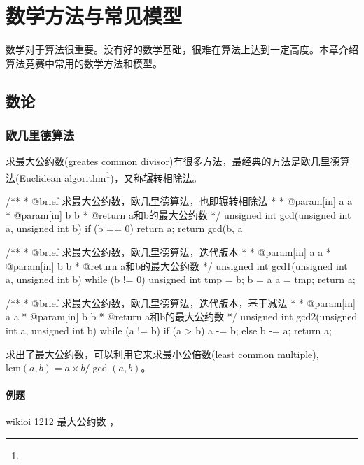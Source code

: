 \chapter{数学方法与常见模型}
数学对于算法很重要。没有好的数学基础，很难在算法上达到一定高度。本章介绍算法竞赛中常用的数学方法和模型。

\section{数论} %

\subsection{欧几里德算法}

求最大公约数(greates common divisor)有很多方法，最经典的方法是欧几里德算法(Euclidean algorithm\footnote{})，又称辗转相除法。

\begin{Codex}[label=gcd.c]
/**
 * @brief 求最大公约数，欧几里德算法，也即辗转相除法
 *
 * @param[in] a a
 * @param[in] b b
 * @return a和b的最大公约数
 */
unsigned int gcd(unsigned int a, unsigned int b) {
    if (b == 0) return a;
    return gcd(b, a %
}

/**
 * @brief 求最大公约数，欧几里德算法，迭代版本
 *
 * @param[in] a a
 * @param[in] b b
 * @return a和b的最大公约数
 */
unsigned int gcd1(unsigned int a, unsigned int b) {
    while (b != 0) {
        unsigned int tmp = b;
        b = a %
        a = tmp;
    }
    return a;
}

/**
 * @brief 求最大公约数，欧几里德算法，迭代版本，基于减法
 *
 * @param[in] a a
 * @param[in] b b
 * @return a和b的最大公约数
 */
unsigned int gcd2(unsigned int a, unsigned int b) {
    while (a != b) {
        if (a > b) {
            a -= b;
        } else {
            b -= a;
        }
    }
    return a;
}
\end{Codex}

求出了最大公约数，可以利用它来求最小公倍数(least common multiple), $\mathrm{lcm}(a,b)=a \times b / \gcd(a,b)$。

\subsubsection{例题}
\begindot
\item wikioi 1212 最大公约数 ，
\myenddot


